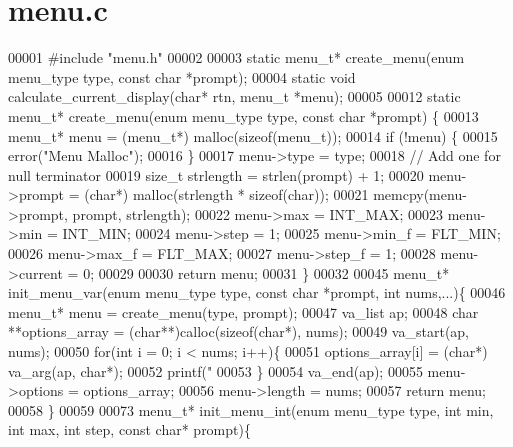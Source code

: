\section{menu.\+c}
\label{menu_8c_source}

\begin{DoxyCode}
00001 \textcolor{preprocessor}{#include "menu.h"}
00002 
00003 \textcolor{keyword}{static} menu_t* create_menu(\textcolor{keyword}{enum} menu_type type, \textcolor{keyword}{const} \textcolor{keywordtype}{char} *prompt);
00004 \textcolor{keyword}{static} \textcolor{keywordtype}{void} calculate_current_display(\textcolor{keywordtype}{char}* rtn, menu_t *menu);
00005 
00012 \textcolor{keyword}{static} menu_t* create_menu(\textcolor{keyword}{enum} menu_type type, \textcolor{keyword}{const} \textcolor{keywordtype}{char} *prompt) \{
00013   menu_t* menu = (menu_t*) malloc(\textcolor{keyword}{sizeof}(menu_t));
00014   \textcolor{keywordflow}{if} (!menu) \{
00015     error(\textcolor{stringliteral}{"Menu Malloc"});
00016   \}
00017   menu->type = type;
00018   \textcolor{comment}{// Add one for null terminator}
00019   \textcolor{keywordtype}{size\_t} strlength = strlen(prompt) + 1;
00020   menu->prompt = (\textcolor{keywordtype}{char}*) malloc(strlength * \textcolor{keyword}{sizeof}(\textcolor{keywordtype}{char}));
00021   memcpy(menu->prompt, prompt, strlength);
00022   menu->max = INT\_MAX;
00023   menu->min = INT\_MIN;
00024   menu->step = 1;
00025   menu->min_f = FLT\_MIN;
00026   menu->max_f = FLT\_MAX;
00027   menu->step_f = 1;
00028   menu->current = 0;
00029 
00030   \textcolor{keywordflow}{return} menu;
00031 \}
00032 
00045 menu_t* init_menu_var(\textcolor{keyword}{enum} menu_type type, \textcolor{keyword}{const} \textcolor{keywordtype}{char} *prompt, \textcolor{keywordtype}{int} nums,...)\{
00046   menu_t* menu = create_menu(type, prompt);
00047   va\_list ap;
00048   \textcolor{keywordtype}{char} **options\_array = (\textcolor{keywordtype}{char}**)calloc(\textcolor{keyword}{sizeof}(\textcolor{keywordtype}{char}*), nums);
00049   va\_start(ap, nums);
00050   \textcolor{keywordflow}{for}(\textcolor{keywordtype}{int} i = 0; i < nums; i++)\{
00051     options\_array[i] = (\textcolor{keywordtype}{char}*) va\_arg(ap, \textcolor{keywordtype}{char}*);
00052     printf(\textcolor{stringliteral}{"%
00053   \}
00054   va\_end(ap);
00055   menu->options = options\_array;
00056   menu->length = nums;
00057   \textcolor{keywordflow}{return} menu;
00058 \}
00059 
00073 menu_t* init_menu_int(\textcolor{keyword}{enum} menu_type type, \textcolor{keywordtype}{int} min, \textcolor{keywordtype}{int} max, \textcolor{keywordtype}{int} step, \textcolor{keyword}{const} \textcolor{keywordtype}{char}* prompt)\{
}
\end{DoxyCode}
